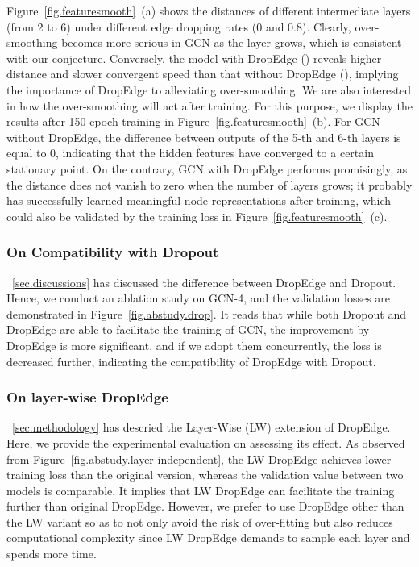 \documentclass{article}
\begin{document}
Figure~\ref{fig.featuresmooth}~(a) shows the distances of different intermediate layers (from 2 to 6) under different edge dropping rates (0 and 0.8). Clearly, over-smoothing becomes more serious in GCN as the layer grows, which is consistent with our conjecture. Conversely, the model with DropEdge () reveals higher distance and slower convergent speed than that without DropEdge (), implying the importance of DropEdge to alleviating over-smoothing.
We are also interested in how the over-smoothing will act after training. For this purpose, we display the results after 150-epoch training in Figure~\ref{fig.featuresmooth}~(b). For GCN without DropEdge, the difference between outputs of the 5-th and 6-th layers is equal to 0, indicating that the hidden features have converged to a certain stationary point. On the contrary, GCN with DropEdge performs promisingly, as the distance does not vanish to zero when the number of layers grows; it probably has successfully learned meaningful node representations after training, which could also be validated by the training loss in Figure~\ref{fig.featuresmooth}~(c).

\subsubsection{On Compatibility with Dropout}
\textsection~\ref{sec.discussions} has discussed the difference between DropEdge and Dropout. Hence, we conduct an ablation study on GCN-4, and the validation losses are demonstrated in Figure~\ref{fig.abstudy.drop}. It reads that while both Dropout and DropEdge are able to facilitate the training of GCN, the improvement by DropEdge is more significant, and if we adopt them concurrently, the loss is decreased further, indicating the compatibility of DropEdge with Dropout.


\subsubsection{On layer-wise DropEdge}
\textsection~\ref{sec:methodology} has descried the Layer-Wise (LW) extension of DropEdge. Here, we provide the experimental evaluation on assessing its effect. As observed from Figure~\ref{fig.abstudy.layer-independent}, the LW DropEdge achieves lower training loss than the original version, whereas the validation value between two models is comparable. It implies that LW DropEdge can facilitate the training further than original DropEdge. However, we prefer to use DropEdge other than the LW variant so as to not only avoid the risk of over-fitting but also reduces computational complexity since LW DropEdge demands to sample each layer and spends more time.
\end{document}
